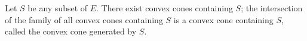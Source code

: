 Let $S$ be any subset of $E$. There exist convex cones containing $S$; the intersection of the family of all convex cones containing $S$ is a convex cone containing $S$, called the convex cone generated by $S$.